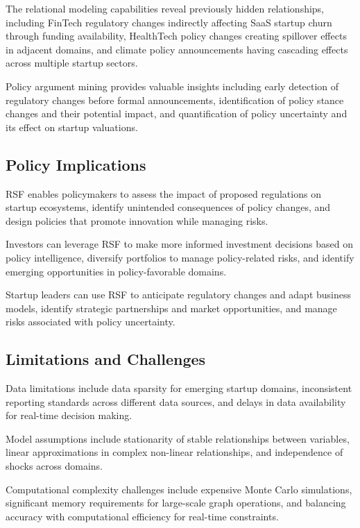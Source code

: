 \documentclass[conference]{IEEEtran}
\begin{document}
The relational modeling capabilities reveal previously hidden relationships, including FinTech regulatory changes indirectly affecting SaaS startup churn through funding availability, HealthTech policy changes creating spillover effects in adjacent domains, and climate policy announcements having cascading effects across multiple startup sectors.

Policy argument mining provides valuable insights including early detection of regulatory changes before formal announcements, identification of policy stance changes and their potential impact, and quantification of policy uncertainty and its effect on startup valuations.

\subsection{Policy Implications}

RSF enables policymakers to assess the impact of proposed regulations on startup ecosystems, identify unintended consequences of policy changes, and design policies that promote innovation while managing risks.

Investors can leverage RSF to make more informed investment decisions based on policy intelligence, diversify portfolios to manage policy-related risks, and identify emerging opportunities in policy-favorable domains.

Startup leaders can use RSF to anticipate regulatory changes and adapt business models, identify strategic partnerships and market opportunities, and manage risks associated with policy uncertainty.

\subsection{Limitations and Challenges}

Data limitations include data sparsity for emerging startup domains, inconsistent reporting standards across different data sources, and delays in data availability for real-time decision making.

Model assumptions include stationarity of stable relationships between variables, linear approximations in complex non-linear relationships, and independence of shocks across domains.

Computational complexity challenges include expensive Monte Carlo simulations, significant memory requirements for large-scale graph operations, and balancing accuracy with computational efficiency for real-time constraints.
\end{document}
